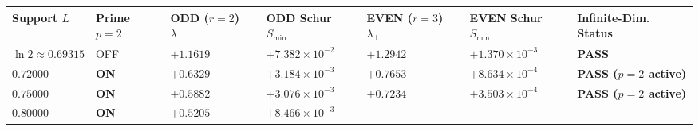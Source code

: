 \documentclass[
  11pt,
]{article}
\newcounter{none} %
\begin{document}
\begin{enumerate}
  {\def\LTcaptype{none} %
  \begin{longtable}[]{@{}
    >{\centering\arraybackslash}p{}
    >{\centering\arraybackslash}p{}
    >{\centering\arraybackslash}p{}
    >{\centering\arraybackslash}p{}
    >{\centering\arraybackslash}p{}
    >{\centering\arraybackslash}p{}
    >{\raggedright\arraybackslash}p{}@{}}
  \toprule\noalign{}
  \begin{minipage}[b]{\linewidth}\centering
  Support \(L\)
  \end{minipage} & \begin{minipage}[b]{\linewidth}\centering
  Prime \(p = 2\)
  \end{minipage} & \begin{minipage}[b]{\linewidth}\centering
  ODD (\(r=2\)) \(\lambda_\perp\)
  \end{minipage} & \begin{minipage}[b]{\linewidth}\centering
  ODD Schur \(S_{\min}\)
  \end{minipage} & \begin{minipage}[b]{\linewidth}\centering
  EVEN (\(r=3\)) \(\lambda_\perp\)
  \end{minipage} & \begin{minipage}[b]{\linewidth}\centering
  EVEN Schur \(S_{\min}\)
  \end{minipage} & \begin{minipage}[b]{\linewidth}\raggedright
  Infinite-Dim. Status
  \end{minipage} \\
  \midrule\noalign{}
  \endhead
  \bottomrule\noalign{}
  \endlastfoot
  \(\ln 2 \approx 0.69315\) & OFF & \(+1.1619\) &
  \(+7.382 \times 10^{-2}\) & \(+1.2942\) & \(+1.370 \times 10^{-3}\) &
  \textbf{PASS} \\
  \(0.72000\) & \textbf{ON} & \(+0.6329\) & \(+3.184 \times 10^{-3}\) &
  \(+0.7653\) & \(+8.634 \times 10^{-4}\) & \textbf{PASS (\(p=2\)
  active)} \\
  \(0.75000\) & \textbf{ON} & \(+0.5882\) & \(+3.076 \times 10^{-3}\) &
  \(+0.7234\) & \(+3.503 \times 10^{-4}\) & \textbf{PASS (\(p=2\)
  active)} \\
  \(0.80000\) & \textbf{ON} & \(+0.5205\) & \(+8.466 \times 10^{-3}\) &

\end{longtable}}
\end{enumerate}
\end{document}
